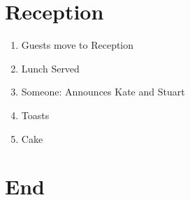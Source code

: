\documentclass[twoside]{article}
\begin{document}
  \section{Reception}
    \begin{enumerate}
      \item Guests move to Reception
      \item Lunch Served
      \item Someone: Announces Kate and Stuart
      \item Toasts
      \item Cake
    \end{enumerate}

  \section{End}
    
\end{document}
